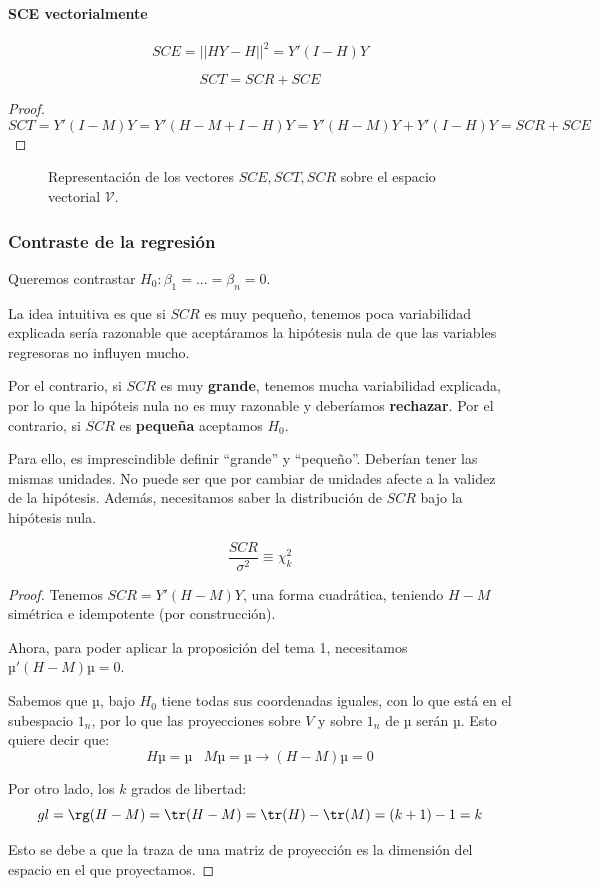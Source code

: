\paragraph{SCE vectorialmente}
\[SCE = ||HY-H||^2 = Y'(I-H)Y\]

\begin{prop}
\[SCT = SCR + SCE\]
\end{prop}

\begin{proof}
\[SCT = Y'(I-M)Y = Y'(H-M+I-H)Y = Y'(H-M)Y + Y'(I-H)Y = SCR + SCE\]
\end{proof}

\begin{figure}[hbtp]
	\centering
	\caption{Representación de los vectores $SCE,SCT,SCR$ sobre el espacio vectorial $\mathcal{V}$.}
\end{figure}

\subsubsection{Contraste de la regresión}
Queremos contrastar $H_0 : β_1 = ... = β_n = 0$.

La idea intuitiva es que si $SCR$ es muy pequeño, tenemos poca variabilidad explicada sería razonable que aceptáramos la hipótesis nula de que las variables regresoras no influyen mucho.

Por el contrario, si $SCR$ es muy \textbf{grande}, tenemos mucha variabilidad explicada, por lo que la hipóteis nula no es muy razonable y deberíamos \textbf{rechazar}. Por el contrario, si $SCR$ es \textbf{pequeña} aceptamos $H_0$.


Para ello, es imprescindible definir ``grande'' y ``pequeño''. Deberían tener las mismas unidades. No puede ser que por cambiar de unidades afecte a la validez de la hipótesis. Además, necesitamos saber la distribución de $SCR$ bajo la hipótesis nula. 

\begin{prop}[Distribución SCR en $H_0:∀i\;β_i=0$]

\[
\frac{SCR}{σ^2} \equiv \chi^2_{k}
\]
\end{prop}
\begin{proof}
Tenemos $SCR = Y'(H-M)Y$, una forma cuadrática, teniendo $H-M$ simétrica e idempotente (por construcción).

Ahora, para poder aplicar la proposición del tema 1, necesitamos $µ'(H-M)µ = 0$.

Sabemos que $µ$, bajo $H_0$ tiene todas sus coordenadas iguales, con lo que está en el subespacio $1_n$, por lo que las proyecciones sobre $V$ y sobre $1_n$ de $µ$ serán $µ$. Esto quiere decir que:
\[ Hµ = µ \;\;\; Mµ = µ \to (H-M)µ=0\]


Por otro lado, los $k$ grados de libertad:
\[
gl = \rg(H-M) = \tr(H-M) = \tr(H) - \tr(M) = (k+1)-1 = k
\]

Esto se debe a que la traza de una matriz de proyección es la dimensión del espacio en el que proyectamos.

\end{proof}

